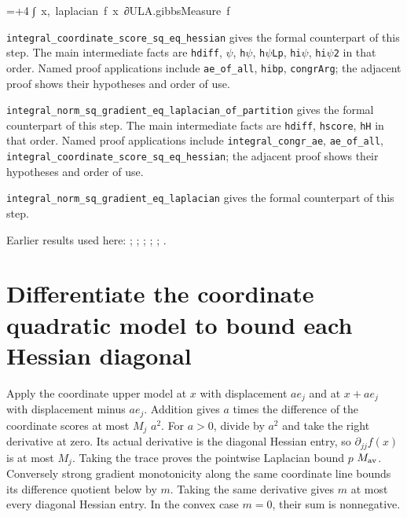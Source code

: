 \documentclass[11pt,a4paper]{article}
\newlength{\leancharwidth}
\newenvironment{leancode}{\par\smallskip\begingroup\ttfamily\footnotesize\raggedright
  \settowidth{\leancharwidth}{M}\setlength{\parskip}{0pt}\setlength{\parindent}{0pt}
  \frenchspacing}{\par\endgroup\smallskip}
\newcommand{\leanline}[2]{\hangindent=\dimexpr#1\leancharwidth+4\leancharwidth\relax
  \hangafter=1\noindent\hspace*{#1\leancharwidth}#2\par}
\newcommand{\leanlabel}[1]{\par\smallskip\noindent{\small\bfseries #1}\par}
\begin{document}
\begin{leanbox}
\begin{leancode}
\leanline{6}{∫\ x,\ laplacian\ f\ x\ ∂ULA.gibbsMeasure\ f}
\end{leancode}
\leanlabel{How the Lean proof follows the argument}
\texttt{integral\_\allowbreak{}coordinate\_\allowbreak{}score\_\allowbreak{}sq\_\allowbreak{}eq\_\allowbreak{}hessian} gives the formal counterpart of this step. The main intermediate facts are \texttt{hdiff}, \texttt{\ensuremath{\psi}}, \texttt{h\ensuremath{\psi}}, \texttt{h\ensuremath{\psi}\allowbreak{}Lp}, \texttt{hi\ensuremath{\psi}}, \texttt{hi\ensuremath{\psi}2} in that order. Named proof applications include \texttt{ae\_\allowbreak{}of\_\allowbreak{}all}, \texttt{hibp}, \texttt{congr\allowbreak{}Arg}; the adjacent proof shows their hypotheses and order of use.




\texttt{integral\_\allowbreak{}norm\_\allowbreak{}sq\_\allowbreak{}gradient\_\allowbreak{}eq\_\allowbreak{}laplacian\_\allowbreak{}of\_\allowbreak{}partition} gives the formal counterpart of this step. The main intermediate facts are \texttt{hdiff}, \texttt{hscore}, \texttt{h\allowbreak{}H} in that order. Named proof applications include \texttt{integral\_\allowbreak{}congr\_\allowbreak{}ae}, \texttt{ae\_\allowbreak{}of\_\allowbreak{}all}, \texttt{integral\_\allowbreak{}coordinate\_\allowbreak{}score\_\allowbreak{}sq\_\allowbreak{}eq\_\allowbreak{}hessian}; the adjacent proof shows their hypotheses and order of use.




\texttt{integral\_\allowbreak{}norm\_\allowbreak{}sq\_\allowbreak{}gradient\_\allowbreak{}eq\_\allowbreak{}laplacian} gives the formal counterpart of this step.
\end{leanbox}


Earlier results used here: \cite[Section~3.26.10]{LangevinLean2026ULASC}; \cite[Section~3.26.2]{LangevinLean2026ULASC}; \cite[Section~3.26.3]{LangevinLean2026ULASC}; \cite[Section~3.26.9]{LangevinLean2026ULASC}; \cite[Section~3.27.7]{LangevinLean2026ULASC}; \cite[Section~3.46.3]{LangevinLean2026ULASC}.

\section{\texorpdfstring{Differentiate the coordinate quadratic model to bound each Hessian diagonal}{Differentiate the coordinate quadratic model to bound each Hessian diagonal}}


Apply the coordinate upper model at \(x\) with displacement \(ae_j\) and at \(x+ae_j\) with displacement minus \(ae_j\). Addition gives \(a\) times the difference of the coordinate scores at most \(M_j\) \(a^2\). For \(a>0\), divide by \(a^2\) and take the right derivative at zero. Its actual derivative is the diagonal Hessian entry, so \(\partial_{jj}f(x)\) is at most \(M_j\). Taking the trace proves the pointwise Laplacian bound \(p\) \(M_{\rm av}\). Conversely strong gradient monotonicity along the same coordinate line bounds its difference quotient below by \(m\). Taking the same derivative gives \(m\) at most every diagonal Hessian entry. In the convex case \(m=0\), their sum is nonnegative.
\end{document}
